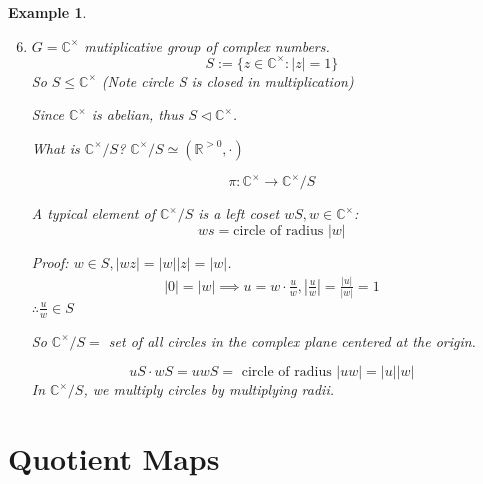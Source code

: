 \documentclass[11pt, oneside]{book}
\theoremstyle{break}
\newtheorem{eg}{Example}[section]
\newcommand{\bb}[1]{\mathbb{#1}}			%
\begin{document}
\begin{eg}
    \begin{enumerate}
        \setcounter{enumi}{5}
        \item $G = \bb{C}^\times$ mutiplicative group of complex numbers.
            \begin{equation}
                S := \{ z \in \bb{C}^\times : |z| = 1 \}
            \end{equation}
            So $S \leq \bb{C}^\times$ (Note circle S is closed in multiplication)

            Since $\bb{C}^\times$ is abelian, thus $S \triangleleft \bb{C}^\times$.

            What is $\bb{C}^\times / S$? $\bb{C}^\times / S \simeq (\bb{R}^{> 0}, \cdot)$

            \begin{equation}
                \pi : \bb{C}^\times \to \bb{C}^\times / S
            \end{equation}

            A typical element of $\bb{C}^\times / S$ is a left coset $wS, w \in \bb{C}^\times$:
            \begin{equation}
                ws = \text{circle of radius } |w|
            \end{equation}

            Proof: $w \in S, |wz| = |w| |z| = |w|$.
            \begin{gather*}
                |0| = |w| \implies u = w \cdot \frac{u}{w} , \left| \frac{u}{w} \right| = \frac{|u|}{|w|} = 1
            \end{gather*}
            $\therefore \frac{u}{w} \in S$

            So $\bb{C}^\times / S =$ set of all circles in the complex plane centered at the origin.

            \begin{equation*}
                uS \cdot wS = uwS = \text{ circle of radius } |uw| = |u||w|
            \end{equation*}
            In $\bb{C}^\times / S$, we multiply circles by multiplying radii.
    \end{enumerate}
\end{eg}

\section{Quotient Maps}\label{sect:quotient maps}
\end{document}
